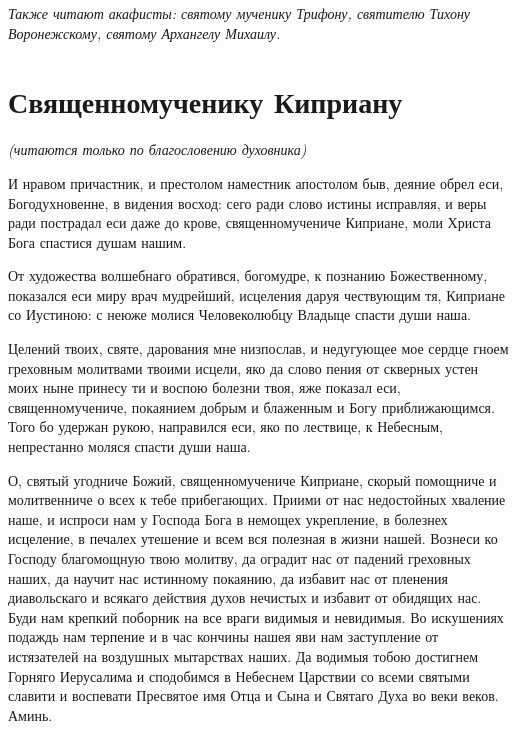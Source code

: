 \itshape Также читают акафисты: святому мученику Трифону, святителю Тихону Воронежскому, святому Архангелу Михаилу.\normalfont{}


\section{Священномученику Киприану}
 


\itshape (читаются только по благословению духовника)\normalfont{}




И нравом причастник, и престолом наместник апостолом быв, деяние обрел еси, Богодухновенне, в видения восход: сего ради слово истины исправляя, и веры ради пострадал еси даже до крове, священномучениче Киприане, моли Христа Бога спастися душам нашим.




От художества волшебнаго обратився, богомудре, к познанию Божественному, показался еси миру врач мудрейший, исцеления даруя чествующим тя, Киприане со Иустиною: с неюже молися Человеколюбцу Владыце спасти души наша.




Целений твоих, святе, дарования мне низпослав, и недугующее мое сердце гноем греховным молитвами твоими исцели, яко да слово пения от скверных устен моих ныне принесу ти и воспою болезни твоя, яже показал еси, священномучениче, покаянием добрым и блаженным и Богу приближающимся. Того бо удержан рукою, направился еси, яко по лествице, к Небесным, непрестанно моляся спасти души наша.




О, святый угодниче Божий, священномучениче Киприане, скорый помощниче и молитвенниче о всех к тебе прибегающих. Приими от нас недостойных хваление наше, и испроси нам у Господа Бога в немощех укрепление, в болезнех исцеление, в печалех утешение и всем вся полезная в жизни нашей. Вознеси ко Господу благомощную твою молитву, да оградит нас от падений греховных наших, да научит нас истинному покаянию, да избавит нас от пленения диавольскаго и всякаго действия духов нечистых и избавит от обидящих нас. Буди нам крепкий поборник на все враги видимыя и невидимыя. Во искушениях подаждь нам терпение и в час кончины нашея яви нам заступление от истязателей на воздушных мытарствах наших. Да водимыя тобою достигнем Горняго Иерусалима и сподобимся в Небеснем Царствии со всеми святыми славити и воспевати Пресвятое имя Отца и Сына и Святаго Духа во веки веков. Аминь.


